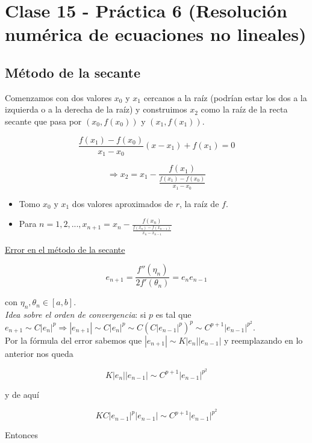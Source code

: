 \section{Clase 15 - Pr\'actica 6 (Resoluci\'on num\'erica de ecuaciones no lineales)}

\subsection{M\'etodo de la secante}

Comenzamos con dos valores $x_{0}$ y $x_{1}$ cercanos a la ra\'iz (podr\'ian estar los dos a la izquierda o a la derecha de la ra\'iz) y construimos $x_{2}$ como la ra\'iz de la recta secante que pasa por $(x_{0}, f(x_{0}))$ y $(x_{1}, f(x_{1}))$.

$$\frac{f(x_{1}) - f(x_{0})}{x_{1} - x_{0}}(x - x_{1}) + f(x_{1}) = 0$$

$$\Rightarrow x_{2} = x_{1} - \frac{f(x_{1})}{\frac{f(x_{1}) - f(x_{0})}{x_{1} - x_{0}}}$$

\begin{itemize}
    \item Tomo $x_{0}$ y $x_{1}$ dos valores aproximados de $r$, la ra\'iz de $f$.\\

    \item Para $n = 1, 2, ..., x_{n + 1} = x_{n} - \frac{f(x_{n})}{\frac{f(x_{n}) - f(x_{n - 1})}{x_{n} - x_{n - 1}}}$
\end{itemize}

\underline{Error en el m\'etodo de la secante}

$$e_{n + 1} = \frac{f''(\eta_{n})}{2f'(\theta_{n})} = e_{n}e_{n - 1}$$

con $\eta_{n}, \theta_{n} \in [a, b]$.\\

\textit{Idea sobre el orden de convergencia}: si $p$ es tal que $e_{n + 1} \sim C|e_{n}|^{p} \Rightarrow |e_{n + 1}| \sim C|e_{n}|^{p} \sim C(C|e_{n - 1}|^{p})^{p} \sim C^{p + 1}|e_{n - 1}|^{p^{2}}$.\\

Por la f\'ormula del error sabemos que $|e_{n + 1}| \sim K|e_{n}||e_{n - 1}|$ y reemplazando en lo anterior nos queda

$$K|e_{n}||e_{n - 1}| \sim C^{p + 1}|e_{n - 1}|^{p^{2}}$$

y de aqu\'i

$$KC|e_{n - 1}|^{p}|e_{n - 1}| \sim C^{p + 1}|e_{n - 1}|^{p^{2}}$$

Entonces

